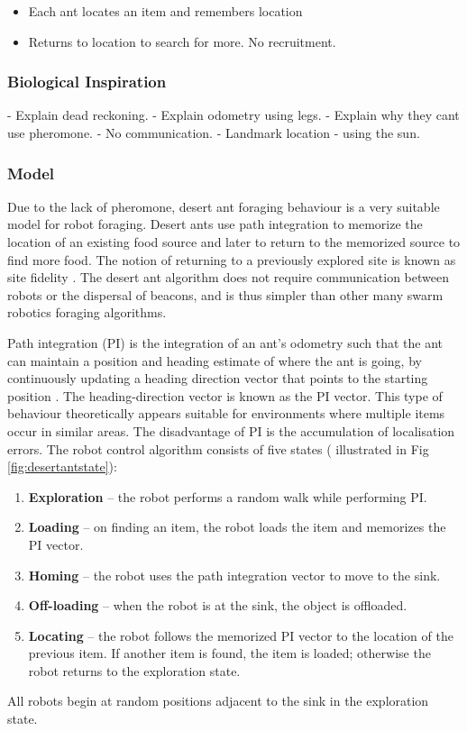 \begin{itemize}
	\item Each ant locates an item and remembers location
	\item Returns to location to search for more. No recruitment.
\end{itemize}

\subsubsection{Biological Inspiration}

	- Explain dead reckoning.
	- Explain odometry using legs. 
	- Explain why they cant use pheromone.
	- No communication.
	- Landmark location - using the sun. 

\subsubsection{Model}
	
Due to the lack of pheromone, desert ant foraging behaviour is a very suitable model for robot foraging. Desert ants use path integration to memorize the location of an existing food source and later to return to the memorized source to find more food. The notion of returning to a previously explored site is known as site fidelity \cite{switzer1993site}. The desert ant algorithm does not require communication between robots or the dispersal of beacons, and is thus simpler than other many swarm robotics foraging algorithms. 

Path integration (PI) is the integration of an ant's odometry such that the ant can maintain a position and heading estimate of where the ant is going, by continuously updating a heading direction vector that points to the starting position \cite{ronacher2008path}. The heading-direction vector is known as the PI vector. This type of behaviour theoretically appears suitable for environments where multiple items occur in similar areas. The disadvantage of PI is the accumulation of localisation errors. The robot control algorithm consists of five states ( illustrated in Fig \ref{fig:desertantstate}):

\begin{enumerate}
	\item\textbf{Exploration} -- the robot performs a random walk while performing PI.
	\item\textbf{Loading} -- on finding an item, the robot loads the item and memorizes the PI vector.
	\item\textbf{Homing } -- the robot uses the path integration vector to move to the sink.
	\item\textbf{Off-loading} -- when the robot is at the sink, the object is offloaded.
	\item\textbf{Locating} -- the robot follows the memorized PI vector to the location of the previous item. If another item is found, the item is loaded; otherwise the robot returns to the exploration state. 
\end{enumerate}
All robots begin at random positions adjacent to the sink in the exploration state.

